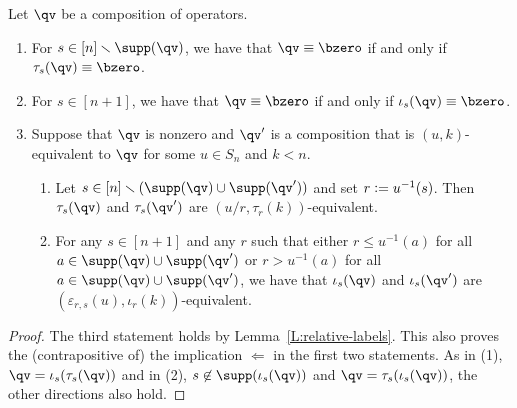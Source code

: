 \begin{corollary}\label{C:single_equivalences}
  Let $\qv$ be a composition of operators.
  \begin{enumerate}[label=(\arabic*)]
    
  \item \label{C:SE_1}
    For $s\in[n]\smallsetminus\supp(\qv)$, we have that $\qv\equiv\bzero$ if and only if $\tau_s(\qv)\equiv\bzero$.

  \item
    For $s\in[n{+}1]$, we have that $\qv\equiv\bzero$ if and only if $\iota_s(\qv)\equiv\bzero$.

  \item  \label{C:SE_3}
    Suppose that $\qv$ is nonzero and $\qv'$ is a composition that is $(u,k)$-equivalent to $\qv$ for some $u\in S_n$ and $k<n$. 
    
        \begin{enumerate}[label=(\roman*)]
        \item  \label{C:SE_3_i}
          Let $s\in[n]\smallsetminus(\supp(\qv)\cup\supp(\qv'))$ and set $r\vcentcolon= u^{-1}(s)$.
          Then $\tau_s(\qv)$ and $\tau_s(\qv')$ are $(u/r,\tau_r(k))$-equivalent.

        \item
          For any $s\in[n{+}1]$ and any $r$ such that either $r\leq u^{-1}(a)$ for all $a\in\supp(\qv)\cup\supp(\qv')$ or
          $r>u^{-1}(a)$ for all $a\in\supp(\qv)\cup\supp(\qv')$, we have that 
          $\iota_s(\qv)$ and $\iota_s(\qv')$ are $(\varepsilon_{r,s}(u), \iota_r(k))$-equivalent.

        \end{enumerate}   
  \end{enumerate}
\end{corollary}

\begin{proof}
  The third statement holds by Lemma~\ref{L:relative-labels}.
  This also proves the (contrapositive of) the implication $\Leftarrow$ in the first two statements.
  As in (1), $\qv=\iota_s(\tau_s(\qv))$ and in (2), $s\not\in\supp(\iota_s(\qv))$ and $\qv=\tau_s(\iota_s(\qv))$, the other
  directions also hold.  
\end{proof}

